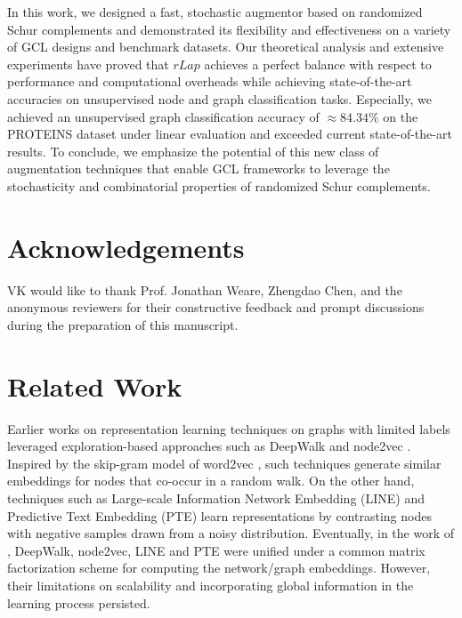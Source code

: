 \documentclass{article}
\theoremstyle{plain}
\theoremstyle{definition}
\theoremstyle{remark}
\begin{document}
In this work, we designed a fast, stochastic augmentor based on randomized Schur complements and demonstrated its flexibility and effectiveness on a variety of GCL designs and benchmark datasets. Our theoretical analysis and extensive experiments have proved that $rLap$ achieves a perfect balance with respect to performance and computational overheads while achieving state-of-the-art accuracies on unsupervised node and graph classification tasks. Especially, we achieved an unsupervised graph classification accuracy of $\approx 84.34 \%$ on the PROTEINS dataset under linear evaluation and exceeded current state-of-the-art results. To conclude, we emphasize the potential of this new class of augmentation techniques that enable GCL frameworks to leverage the stochasticity and combinatorial properties of randomized Schur complements.

\section*{Acknowledgements}

VK would like to thank Prof. Jonathan Weare, Zhengdao Chen,  and the anonymous reviewers for their constructive feedback and prompt discussions during the preparation of this manuscript.












\newpage
\appendix
\onecolumn

\section{Related Work}
\label{app:related_work}

Earlier works on representation learning techniques on graphs with limited labels leveraged exploration-based approaches such as DeepWalk \citep{perozzi2014deepwalk} and node2vec \citep{grover2016node2vec}. Inspired by the skip-gram model of word2vec \citep{mikolov2013efficient}, such techniques generate similar embeddings for nodes that co-occur in a random walk. On the other hand, techniques such as Large-scale Information Network Embedding (LINE) \citep{tang2015line} and Predictive Text Embedding (PTE) \citep{tang2015pte} learn representations by contrasting nodes with negative samples drawn from a noisy distribution. Eventually, in the work of \citet{qiu2018network}, DeepWalk, node2vec, LINE and PTE were unified under a common matrix factorization scheme for computing the network/graph embeddings. However, their limitations on scalability and incorporating global information in the learning process persisted.
\end{document}

